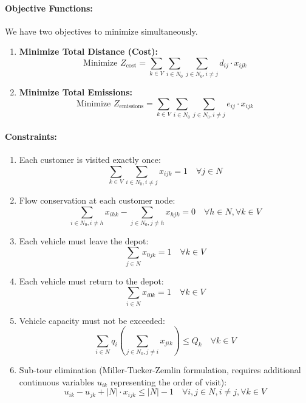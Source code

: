 \documentclass{article}
\begin{document}
\paragraph{Objective Functions:}
We have two objectives to minimize simultaneously.
\begin{enumerate}
    \item \textbf{Minimize Total Distance (Cost):}
    \begin{equation}
        \text{Minimize } Z_{\text{cost}} = \sum_{k \in V} \sum_{i \in N_0} \sum_{j \in N_0, i \neq j} d_{ij} \cdot x_{ijk}
    \end{equation}
    \item \textbf{Minimize Total Emissions:}
    \begin{equation}
        \text{Minimize } Z_{\text{emissions}} = \sum_{k \in V} \sum_{i \in N_0} \sum_{j \in N_0, i \neq j} e_{ij} \cdot x_{ijk}
    \end{equation}
\end{enumerate}

\paragraph{Constraints:}
\begin{enumerate}[label=\textbf{C\arabic*:}, wide, labelwidth=!, labelindent=0pt]
    \item Each customer is visited exactly once:
    \begin{equation*}
        \sum_{k \in V} \sum_{i \in N_0, i \neq j} x_{ijk} = 1 \quad \forall j \in N
    \end{equation*}
    \item Flow conservation at each customer node:
    \begin{equation*}
        \sum_{i \in N_0, i \neq h} x_{ihk} - \sum_{j \in N_0, j \neq h} x_{hjk} = 0 \quad \forall h \in N, \forall k \in V
    \end{equation*}
    \item Each vehicle must leave the depot:
    \begin{equation*}
        \sum_{j \in N} x_{0jk} = 1 \quad \forall k \in V
    \end{equation*}
    \item Each vehicle must return to the depot:
    \begin{equation*}
        \sum_{i \in N} x_{i0k} = 1 \quad \forall k \in V
    \end{equation*}
    \item Vehicle capacity must not be exceeded:
    \begin{equation*}
        \sum_{i \in N} q_i \left( \sum_{j \in N_0, j \neq i} x_{jik} \right) \leq Q_k \quad \forall k \in V
    \end{equation*}
    \item Sub-tour elimination (Miller-Tucker-Zemlin formulation, requires additional continuous variables $u_{ik}$ representing the order of visit):
    \begin{equation*}
        u_{ik} - u_{jk} + |N| \cdot x_{ijk} \leq |N| - 1 \quad \forall i, j \in N, i \neq j, \forall k \in V
    \end{equation*}
\end{enumerate}
\end{document}
